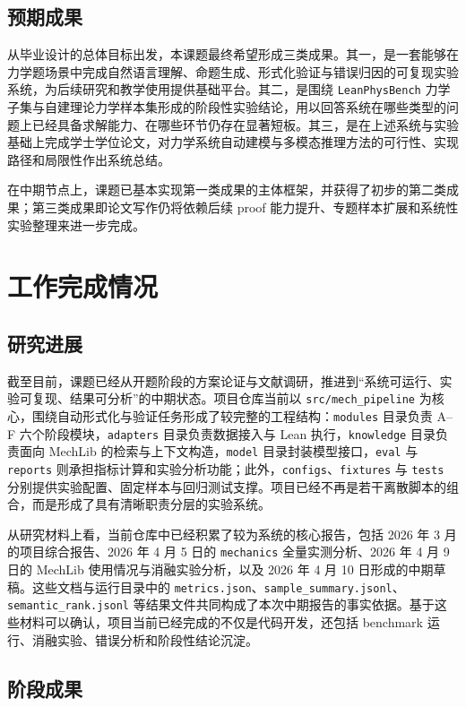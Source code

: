 \documentclass[12pt,a4paper]{ctexart}
\begin{document}
\subsection{预期成果}

从毕业设计的总体目标出发，本课题最终希望形成三类成果。其一，是一套能够在力学题场景中完成自然语言理解、命题生成、形式化验证与错误归因的可复现实验系统，为后续研究和教学使用提供基础平台。其二，是围绕 \texttt{LeanPhysBench} 力学子集与自建理论力学样本集形成的阶段性实验结论，用以回答系统在哪些类型的问题上已经具备求解能力、在哪些环节仍存在显著短板。其三，是在上述系统与实验基础上完成学士学位论文，对力学系统自动建模与多模态推理方法的可行性、实现路径和局限性作出系统总结。

在中期节点上，课题已基本实现第一类成果的主体框架，并获得了初步的第二类成果；第三类成果即论文写作仍将依赖后续 proof 能力提升、专题样本扩展和系统性实验整理来进一步完成。

\section{工作完成情况}

\subsection{研究进展}

截至目前，课题已经从开题阶段的方案论证与文献调研，推进到“系统可运行、实验可复现、结果可分析”的中期状态。项目仓库当前以 \texttt{src/mech\_pipeline} 为核心，围绕自动形式化与验证任务形成了较完整的工程结构：\texttt{modules} 目录负责 A--F 六个阶段模块，\texttt{adapters} 目录负责数据接入与 Lean 执行，\texttt{knowledge} 目录负责面向 MechLib 的检索与上下文构造，\texttt{model} 目录封装模型接口，\texttt{eval} 与 \texttt{reports} 则承担指标计算和实验分析功能；此外，\texttt{configs}、\texttt{fixtures} 与 \texttt{tests} 分别提供实验配置、固定样本与回归测试支撑。项目已经不再是若干离散脚本的组合，而是形成了具有清晰职责分层的实验系统。

从研究材料上看，当前仓库中已经积累了较为系统的核心报告，包括 2026 年 3 月的项目综合报告、2026 年 4 月 5 日的 \texttt{mechanics} 全量实测分析、2026 年 4 月 9 日的 MechLib 使用情况与消融实验分析，以及 2026 年 4 月 10 日形成的中期草稿。这些文档与运行目录中的 \texttt{metrics.json}、\texttt{sample\_summary.jsonl}、\texttt{semantic\_rank.jsonl} 等结果文件共同构成了本次中期报告的事实依据。基于这些材料可以确认，项目当前已经完成的不仅是代码开发，还包括 benchmark 运行、消融实验、错误分析和阶段性结论沉淀。

\subsection{阶段成果}
\end{document}

